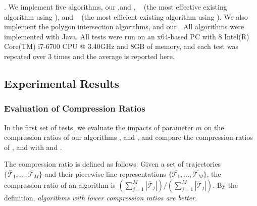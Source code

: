 
.
We implement five \lsa algorithms, \ie our \cist ,\cista and \cisto, \dps~\cite{Meratnia:Spatiotemporal} (the most effective existing \lsa algorithm using \sed), and \squishe~\cite{Muckell:Compression} (the most efficient existing \lsa algorithm using \sed).
We also implement the polygon intersection algorithms, \cpia and our \rpia.
All algorithms were implemented with Java.
All tests were run on an {x64-based  PC with 8 Intel(R) Core(TM) i7-6700 CPU @ 3.40GHz and 8GB of memory, and each test was repeated
over 3 times and the average is reported here}.
%

\subsection{Experimental Results}


\subsubsection{Evaluation of Compression Ratios}


In the first set of tests, we evaluate the impacts of parameter $m$ on the
compression ratios of our algorithms \cisto, \cist and \cista, and compare the compression ratios of \cisto, \cist and \cista with \dps and \squishe.

The compression ratio is defined as follows: Given a set of trajectories $\{\dddot{\mathcal{T}_1}, \ldots, \dddot{\mathcal{T}_M}\}$ and their piecewise line representations $\{\overline{\mathcal{T}_1}, \ldots, \overline{\mathcal{T}_M}\}$, the compression ratio of an algorithm is $(\sum_{j=1}^{M} |\overline{\mathcal{T}}_j |)/(\sum_{j=1}^{M} |\dddot{\mathcal{T}}_j |)$.
By the definition, \emph{algorithms with lower compression ratios are better}.





